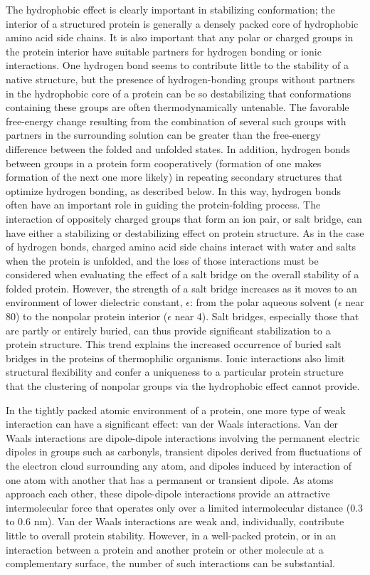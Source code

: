 The hydrophobic effect is clearly important in stabilizing conformation; the interior of a structured protein is generally a densely packed core of hydrophobic amino acid side chains. It is also important that any polar or charged groups in the protein interior have suitable partners for hydrogen bonding or ionic interactions. One hydrogen bond seems to contribute little to the stability of a native structure, but the presence of hydrogen-bonding groups without partners in the hydrophobic core of a protein can be so destabilizing that conformations containing these groups are often thermodynamically untenable. The favorable free-energy change resulting from the combination of several such groups with partners in the surrounding solution can be greater than the free-energy difference between the folded and unfolded states. In addition, hydrogen bonds between groups in a protein form cooperatively (formation of one makes formation of the next one more likely) in repeating secondary structures that optimize hydrogen bonding, as described below. In this way, hydrogen bonds often have an important role in guiding the protein-folding process. The interaction of oppositely charged groups that form an ion pair, or salt bridge, can have either a stabilizing or destabilizing effect on protein structure. As in the case of hydrogen bonds, charged amino acid side chains interact with water and salts when the protein is unfolded, and the loss of those interactions must be considered when evaluating the effect of a salt bridge on the overall stability of a folded protein. However, the strength of a salt bridge increases as it moves to an environment of lower dielectric constant, $\epsilon$: from the polar aqueous solvent ($\epsilon$ near 80) to the nonpolar protein interior ($\epsilon$ near 4). Salt bridges, especially those that are partly or entirely buried, can thus provide significant stabilization to a protein structure. This trend explains the increased occurrence of buried salt bridges in the proteins of thermophilic organisms. Ionic interactions also limit structural flexibility and confer a uniqueness to a particular protein structure that the clustering of nonpolar groups via the hydrophobic effect cannot provide. 

In the tightly packed atomic environment of a protein, one more type of weak interaction can have a significant effect: van der Waals interactions. Van der Waals interactions are dipole-dipole interactions involving the permanent electric dipoles in groups such as carbonyls, transient dipoles derived from fluctuations of the electron cloud surrounding any atom, and dipoles induced by interaction of one atom with another that has a permanent or transient dipole. As atoms approach each other, these dipole-dipole interactions provide an attractive intermolecular force that operates only over a limited intermolecular distance (0.3 to 0.6 nm). Van der Waals interactions are weak and, individually, contribute little to overall protein stability. However, in a well-packed protein, or in an interaction between a protein and another protein or other molecule at a complementary surface, the number of such interactions can be substantial. 

